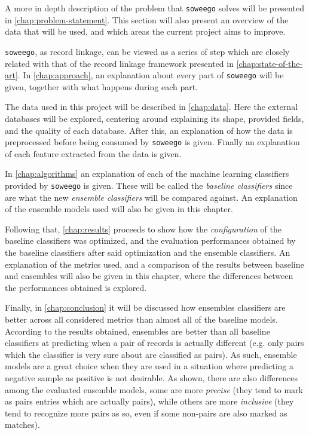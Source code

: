 \documentclass[epsfig,a4paper,11pt,titlepage,twoside,openany]{book}
\newcommand{\soweego}[0]{\texttt{soweego}\xspace}
\begin{document}
A more in depth description of the problem that \soweego solves will be presented in \autoref{chap:problem-statement}. This section will also present an overview of the data that will be used, and which areas the current project aims to improve.

\soweego, as record linkage, can be viewed as a series of step which are closely related with that of the record linkage framework presented in \autoref{chap:state-of-the-art}. In \autoref{chap:approach}, an explanation about every part of \soweego will be given, together with what happens during each part. 

The data used in this project will be described in \autoref{chap:data}. Here the external databases will be explored, centering around explaining its shape, provided fields, and the quality of each database. After this, an explanation of how the data is preprocessed before being consumed by \soweego is given. Finally an explanation of each feature extracted from the data is given.

In \autoref{chap:algorithms} an explanation of each of the machine learning classifiers provided by \soweego is given. These will be called the \textit{baseline classifiers} since are what the new \textit{ensemble classifiers} will be compared against. An explanation of the ensemble models used will also be given in this chapter.

Following that, \autoref{chap:results} proceeds to show how the \textit{configuration} of the baseline classifiers was optimized, and the evaluation performances obtained by the baseline classifiers after said optimization and the ensemble classifiers. An explanation of the metrics used, and a comparison of the results between baseline and ensembles will also be given in this chapter, where the differences between the performances obtained is explored.

Finally, in \autoref{chap:conclusion} it will be discussed how ensembles classifiers are better across all considered metrics than almost all of the baseline models. According to the results obtained, ensembles are better than all baseline classifiers at predicting when a pair of records is actually different (e.g. only pairs which the classifier is very sure about are classified as pairs). As such, ensemble models are a great choice when they are used in a situation where predicting a negative sample as positive is not desirable. As shown, there are also differences among the evaluated ensemble models, some are more \textit{precise} (they tend to mark as pairs entries which are actually pairs), while others are more \textit{inclusive} (they tend to recognize more pairs as so, even if some non-pairs are also marked as matches). 
\end{document}
